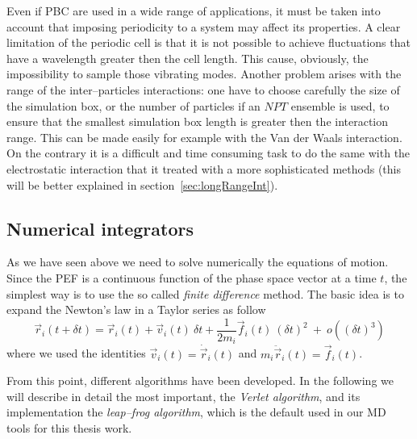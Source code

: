 Even if \ac{PBC} are used in a wide range of applications, it must be taken into account that imposing periodicity to a system may affect its properties. A clear limitation of the periodic cell is that it is not possible to achieve fluctuations that have a wavelength greater then the cell length. This cause, obviously, the impossibility to sample those vibrating modes. Another problem arises with the range of the inter--particles interactions: one have to choose carefully the size of the simulation box, or the number of particles if an $NPT$ ensemble is used, to ensure that the smallest simulation box length is greater then the interaction range. This can be made easily for example with the Van der Waals interaction. On the contrary it is a difficult and time consuming task to do the same with the electrostatic interaction that it treated with a more sophisticated methods (this will be better explained in section~\ref{sec:longRangeInt}).

\subsection{Numerical integrators}
As we have seen above we need to solve numerically the equations of motion. Since the \ac{PEF} is a continuous function of the phase space vector at a time $t$, the simplest way is to use the so called \textit{finite difference} method. The basic idea is to expand the Newton's law in a Taylor series as follow
\begin{equation}
	\vec r_i(t + \delta t) = \vec r_i(t) + \vec v_i(t)\ \delta t + \frac{1}{2m_i}\vec f_i(t)\ (\delta t)^2\ +\ o((\delta t)^3)
	\label{eq:newtonTaylor}
\end{equation}
where we used the identities $\vec v_i(t) = \dot{\vec r}_i(t)$ and $m_i\ddot{\vec r}_i(t) = \vec f_i(t)$.

From this point, different algorithms have been developed. In the following we will describe in detail the most important, the \textit{Verlet algorithm}, and its implementation the \textit{leap--frog algorithm}, which is the default used in our \ac{MD} tools for this thesis work.

